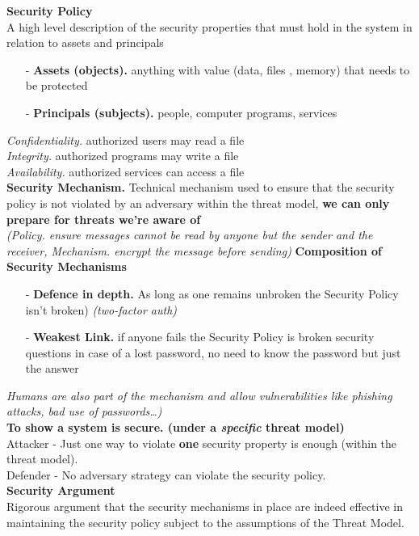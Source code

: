 \documentclass[8pt]{article}
\begin{document}
\begin{minipage}[t]{0.49\textwidth}
	\noindent \textbf{Security Policy}\\
	A high level description of the security properties that must hold in the system in relation to assets and principals
	\begin{itemize}
		\item[-] \textbf{Assets (objects).} anything with value (data, files , memory) that needs to be protected
		\item[-] \textbf{Principals (subjects).} people, computer programs, services
	\end{itemize}
	\textit{Confidentiality.} authorized users may read a file\\
	\textit{Integrity.} authorized programs may write a file\\
	\textit{Availability.} authorized services can access a file\\
	\noindent \textbf{Security Mechanism.} Technical mechanism used to ensure that the security policy is not violated by an adversary within the threat model, \textbf{we can only prepare for threats we're aware of} \\\textit{(Policy. ensure messages cannot be read by anyone but the sender and the receiver, Mechanism. encrypt the message before sending)}
	\noindent \textbf{Composition of Security Mechanisms}
	\begin{itemize}
		\item[-] \textbf{Defence in depth.} As long as one remains unbroken the Security Policy isn't broken) \textit{(two-factor auth)}
		\item[-] \textbf{Weakest Link.} if anyone fails the Security Policy is broken security questions in case of a lost password, no need to know the password but just the answer
	\end{itemize}
	\textit{Humans are also part of the mechanism and allow vulnerabilities like phishing attacks, bad use of passwords\dots)}\\
	\noindent  \textbf{To show a system is secure. (under a \textit{specific} threat model)} \\
	Attacker - Just one way to violate \textbf{one} security property is enough (within the threat model).\\
	Defender - No adversary strategy can violate the security policy.\\
	\noindent \textbf{Security Argument}\\
	Rigorous argument that the security mechanisms in place are indeed effective in maintaining the security policy subject to the assumptions of the Threat Model.
\end{minipage}\\[8px]
\end{document}
